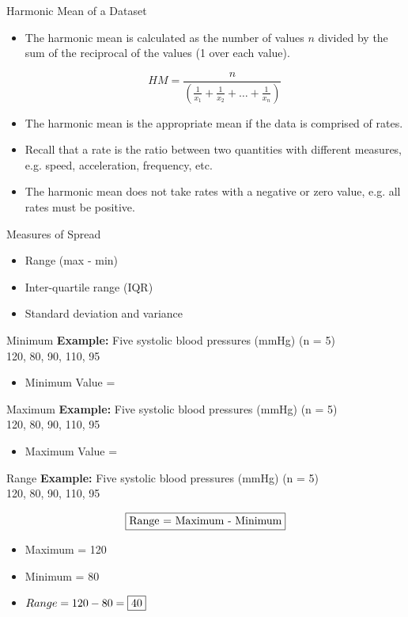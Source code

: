 \documentclass[10pt,dvipsnames, aspectratio=169]{beamer}
\begin{document}
\begin{frame}[t]{Harmonic Mean of a Dataset}
	\begin{itemize}
		\item The harmonic mean is calculated as the number of values $n$ 
		divided 
		by the sum of the reciprocal of the values (1 over each value).
		
		$$HM =  \frac{n}{(\frac{1}{x_1} + \frac{1}{x_2} + … + \frac{1}{x_n})}$$
		\item The harmonic mean is the appropriate mean if the data is 
		comprised of rates.
		
		\item Recall that a rate is the ratio between two quantities with 
		different measures, e.g. speed, acceleration, frequency, etc.
		\item The harmonic mean does not take rates with a negative or zero 
		value, e.g. all rates must be positive.
	\end{itemize}
\end{frame}
\begin{frame}[t]{Measures of Spread}
	\begin{itemize}
		\item Range (max - min)
		\item Inter-quartile range (IQR)
		\item Standard deviation and variance
	\end{itemize}
\end{frame}

\begin{frame}[t]{Minimum}
	\textbf{Example:}	Five systolic blood pressures (mmHg) (n = 5) \\
	120, 80, 90, 110, 95
	\begin{itemize}
		\item Minimum Value = 
	\end{itemize}
\end{frame}

\begin{frame}[t]{Maximum}
	\textbf{Example:}	Five systolic blood pressures (mmHg) (n = 5) \\
	120, 80, 90, 110, 95
	\begin{itemize}
		\item Maximum Value = 
	\end{itemize}
\end{frame}

\begin{frame}[t]{Range}
	\textbf{Example:}	Five systolic blood pressures (mmHg) (n = 5) \\
	120, 80, 90, 110, 95
	
	$$
	\fbox{Range = Maximum - Minimum}
	$$ 
	
	\begin{itemize}
		\item Maximum = 120
		\item Minimum = 80 
		\item 	$
		Range = 120 - 80 = \fbox{40}
		$ 
	\end{itemize}
	
\end{frame}
\end{document}
